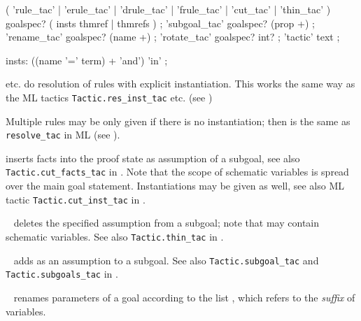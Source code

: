 \begin{isabellebody}
\begin{isamarkuptext}
  \begin{rail}
    ( 'rule\_tac' | 'erule\_tac' | 'drule\_tac' | 'frule\_tac' | 'cut\_tac' | 'thin\_tac' ) goalspec?
    ( insts thmref | thmrefs )
    ;
    'subgoal\_tac' goalspec? (prop +)
    ;
    'rename\_tac' goalspec? (name +)
    ;
    'rotate\_tac' goalspec? int?
    ;
    'tactic' text
    ;

    insts: ((name '=' term) + 'and') 'in'
    ;
  \end{rail}

\begin{descr}

  \item [\hyperlink{method.rule-tac}{\mbox{\isa{rule{\isacharunderscore}tac}}} etc.] do resolution of rules with explicit
  instantiation.  This works the same way as the ML tactics \verb|Tactic.res_inst_tac| etc. (see \cite[\S3]{isabelle-ref})

  Multiple rules may be only given if there is no instantiation; then
  \hyperlink{method.rule-tac}{\mbox{}} is the same as \verb|resolve_tac| in ML (see
  \cite[\S3]{isabelle-ref}).

  \item [\hyperlink{method.cut-tac}{\mbox{\isa{cut{\isacharunderscore}tac}}}] inserts facts into the proof state as
  assumption of a subgoal, see also \verb|Tactic.cut_facts_tac| in
  \cite[\S3]{isabelle-ref}.  Note that the scope of schematic
  variables is spread over the main goal statement.  Instantiations
  may be given as well, see also ML tactic \verb|Tactic.cut_inst_tac|
  in \cite[\S3]{isabelle-ref}.

  \item [\hyperlink{method.thin-tac}{\mbox{\isa{thin{\isacharunderscore}tac}}}~\isa{{\isasymphi}}] deletes the specified
  assumption from a subgoal; note that \isa{{\isasymphi}} may contain schematic
  variables.  See also \verb|Tactic.thin_tac| in
  \cite[\S3]{isabelle-ref}.

  \item [\hyperlink{method.subgoal-tac}{\mbox{\isa{subgoal{\isacharunderscore}tac}}}~\isa{{\isasymphi}}] adds \isa{{\isasymphi}} as an
  assumption to a subgoal.  See also \verb|Tactic.subgoal_tac| and \verb|Tactic.subgoals_tac| in \cite[\S3]{isabelle-ref}.

  \item [\hyperlink{method.rename-tac}{\mbox{\isa{rename{\isacharunderscore}tac}}}~\isa{{\isachardoublequote}x\isactrlsub {\isadigit{1}}\ {\isasymdots}\ x\isactrlsub n{\isachardoublequote}}] renames
  parameters of a goal according to the list , which refers to the \emph{suffix} of variables.


\end{descr}
\end{isamarkuptext}
\end{isabellebody}
